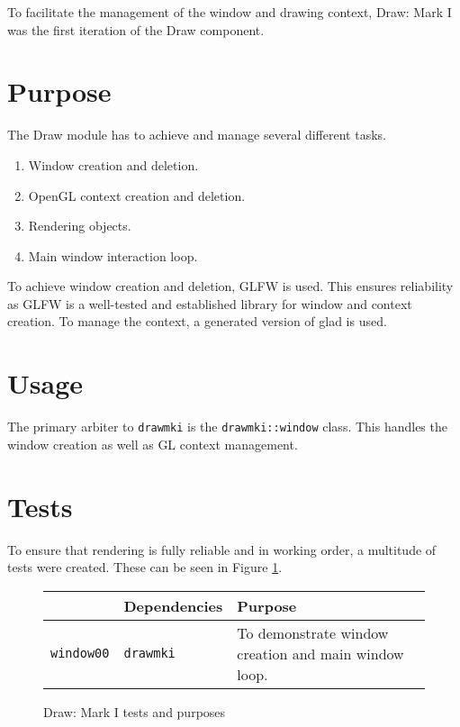 
To facilitate the management of the window and drawing context, Draw: Mark I was
the first iteration of the Draw component.

\section{Purpose}

The Draw module has to achieve and manage several different tasks.

\begin{enumerate}
    \item Window creation and deletion.
    \item OpenGL context creation and deletion.
    \item Rendering objects.
    \item Main window interaction loop.
\end{enumerate}

To achieve window creation and deletion, GLFW is used. This ensures reliability
as GLFW is a well-tested and established library for window and context
creation. To manage the context, a generated version of glad is used.

\section{Usage}

The primary arbiter to \texttt{drawmki} is the \texttt{drawmki::window} class.
This handles the window creation as well as GL context management.

\section{Tests}

To ensure that rendering is fully reliable and in working order, a multitude of
tests were created. These can be seen in Figure \ref{fig:drawmki/tests}.

\begin{figure}[h]
    \centering
    \bgroup
    \def\arraystretch{1.5}
    \begin{tabular}{| l | l | p{} |}
        \hline
        & Dependencies & Purpose \\ \hline
        \texttt{window00} & \texttt{drawmki} & To demonstrate window creation
        and main window loop. \\ \hline
    \end{tabular}
    \egroup
    \caption{Draw: Mark I tests and purposes}
    \label{fig:drawmki/tests}
\end{figure}

